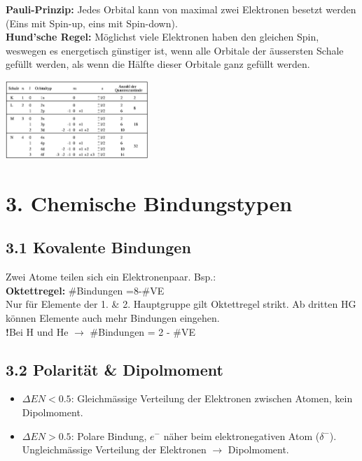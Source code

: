 \begin{multicols*}{4}
{\begin{itemize}[noitemsep, leftmargin=*]
    \end{itemize}
    \textbf{Pauli-Prinzip:} Jedes Orbital kann von maximal zwei Elektronen besetzt werden (Eins mit Spin-up, eins mit Spin-down).
    \vspace{1mm}\\
    \textbf{Hund'sche Regel:} Möglichst viele Elektronen haben den gleichen Spin,  weswegen es energetisch günstiger ist, wenn alle 
    Orbitale der äussersten Schale gefüllt werden, als wenn die Hälfte dieser Orbitale ganz gefüllt werden.\par
    \vspace{1mm}\centering
    \includegraphics[width=54mm]{Bilder/Quantenzahlen.PNG}
    }


	
\section{3. Chemische Bindungstypen}

\subsection{3.1 Kovalente Bindungen}{
    Zwei Atome teilen sich ein Elektronenpaar. Bsp.:\\
    


    \textbf{Oktettregel:} \#Bindungen =8-\#VE\\
    Nur für Elemente der 1. \& 2. Hauptgruppe gilt Oktettregel strikt. 
    Ab dritten HG können Elemente auch mehr Bindungen eingehen.\\
    \textbf{!}Bei H und He $\rightarrow$ \#Bindungen = 2 - \#VE
}


\subsection{3.2 Polarität \& Dipolmoment}{
    \begin{itemize}[noitemsep, leftmargin=*]
    \item $\Delta EN<0.5$: Gleichmässige Verteilung der Elektronen zwischen Atomen, kein Dipolmoment.
    \item $\Delta EN>0.5$: Polare Bindung, $e^-$ näher beim elektronegativen Atom ($\delta^-$).
    Ungleichmässige Verteilung der Elektronen $\rightarrow$ Dipolmoment.
    

\end{itemize}}
\end{multicols*}
